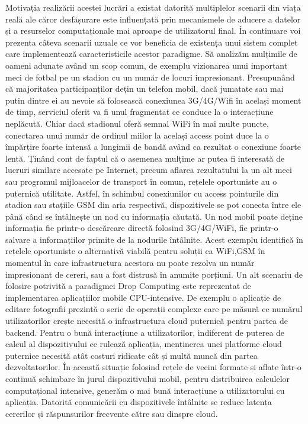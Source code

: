 \documentclass[12pt,a4paper]{report}
\begin{document}
Motivația realizării acestei lucrări a existat datorită multiplelor scenarii din viața reală ale căror desfășurare este influențată prin mecanismele de aducere a datelor și a resurselor computaționale mai aproape de utilizatorul final. În continuare voi prezenta câteva scenarii uzuale ce vor beneficia de existența unui sistem complet care implementează caracteristicile acestor paradigme. Să analizăm mulțimile de oameni adunate având un scop comun, de exemplu vizionarea unui important meci de fotbal pe un stadion cu un număr de locuri impresionant. Presupunând că majoritatea participanților dețin un telefon mobil, dacă jumatate sau mai putin dintre ei au nevoie să folosească conexiunea 3G/4G/Wifi în același moment de timp, serviciul oferit va fi unul fragmentat ce conduce la o interacțiune neplăcută. Chiar dacă stadionul oferă semnal WiFi în mai multe puncte, conectarea unui număr de ordinul miilor la același access point duce la o împărțire foarte intensă a lungimii de bandă având ca rezultat o conexiune foarte lentă. Ținând cont de faptul că o asemenea mulțime ar putea fi interesată de lucruri similare accesate pe Internet, precum aflarea rezultatului la un alt meci sau programul mijloacelor de transport în comun, rețelele oportuniste au o puternică utilitate. Astfel, în schimbul conexiunilor cu access pointurile din stadion sau stațiile GSM din aria respectivă, dispozitivele se pot conecta între ele până când se întâlnește un nod cu informația căutată. Un nod mobil poate deține informația fie printr-o descărcare directă folosind 3G/4G/WiFi, fie printr-o salvare a informațiilor primite de la nodurile întâlnite. Acest exemplu identifică în rețelele oportuniste o alternativă viabilă pentru soluții ca WiFi,GSM în momentul în care infrastructura acestora nu poate rezolva un număr impresionant de cereri, sau a fost distrusă în anumite porțiuni.
Un alt scenariu de folosire potrivită a paradigmei Drop Computing este reprezentat de implementarea aplicațiilor mobile CPU-intensive. De exemplu o aplicație de editare fotografii prezintă o serie de operații complexe care pe măsură ce numărul utilizatorilor crește necesită o infrastructura cloud puternică pentru partea de backend. Pentru o bună interacțiune a utilizatorilor, indiferent de puterea de calcul al dispozitivului ce rulează aplicația, menținerea unei platforme cloud puternice necesită atât costuri ridicate cât și multă muncă din partea dezvoltatorilor. În această situație folosind rețele de vecini formate și aflate într-o continuă schimbare în jurul dispozitivului mobil, pentru distribuirea calculelor computațional intensive, generăm o mai bună interacțiune a utilizatorului cu aplicația. Datorită comunicării cu dispozitivele întâlnite se reduce latența cererilor și răspunsurilor frecvente către sau dinspre cloud.
\end{document}
